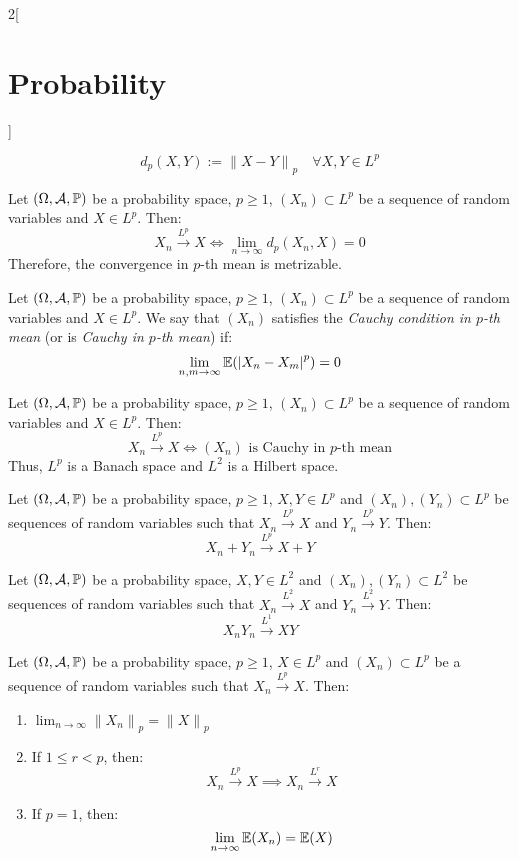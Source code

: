 \documentclass[../../../main_math.tex]{subfiles}
\begin{document}
\begin{multicols}{2}[\section{Probability}]
\begin{proposition}
    $$d_p(X,Y):={\|X-Y\|}_p\quad\forall X,Y\in L^p$$
  \end{proposition}
  \begin{proposition}
    Let $(\Omega,\mathcal{A},\mathbb{P})$ be a probability space, $p\geq 1$, $(X_n)\subset L^p$ be a sequence of random variables and $X\in L^p$. Then:
    $$X_n\overset{L^p}{\longrightarrow} X\iff\lim_{n\to\infty}d_p(X_n,X)=0$$
    Therefore, the convergence in $p$-th mean is metrizable.
  \end{proposition}
  \begin{definition}
    Let $(\Omega,\mathcal{A},\mathbb{P})$ be a probability space, $p\geq 1$, $(X_n)\subset L^p$ be a sequence of random variables and $X\in L^p$. We say that $(X_n)$ satisfies the \emph{Cauchy condition in $p$-th mean} (or is \emph{Cauchy in $p$-th mean}) if: $$\lim_{n,m\to\infty}\mathbb{E}({|X_n-X_m|}^p)=0$$
  \end{definition}
  \begin{proposition}
    Let $(\Omega,\mathcal{A},\mathbb{P})$ be a probability space, $p\geq 1$, $(X_n)\subset L^p$ be a sequence of random variables and $X\in L^p$. Then:
    $$X_n\overset{L^p}{\longrightarrow} X\iff(X_n)\text{ is Cauchy in $p$-th mean}$$
    Thus, $L^p$ is a Banach space and $L^2$ is a Hilbert space.
  \end{proposition}
  \begin{proposition}
    Let $(\Omega,\mathcal{A},\mathbb{P})$ be a probability space, $p\geq 1$, $X,Y\in L^p$ and $(X_n),(Y_n)\subset L^p$ be sequences of random variables such that $X_n\overset{L^p}{\longrightarrow} X$ and $Y_n\overset{L^p}{\longrightarrow} Y$. Then: $$X_n+Y_n\overset{L^p}{\longrightarrow} X+Y$$
  \end{proposition}
  \begin{proposition}
    Let $(\Omega,\mathcal{A},\mathbb{P})$ be a probability space, $X,Y\in L^2$ and $(X_n),(Y_n)\subset L^2$ be sequences of random variables such that $X_n\overset{L^2}{\longrightarrow} X$ and $Y_n\overset{L^2}{\longrightarrow} Y$. Then: $$X_nY_n\overset{L^1}{\longrightarrow} XY$$
  \end{proposition}
  \begin{proposition}
    Let $(\Omega,\mathcal{A},\mathbb{P})$ be a probability space, $p\geq 1$, $X\in L^p$ and $(X_n)\subset L^p$ be a sequence of random variables such that $X_n\overset{L^p}{\longrightarrow} X$. Then:
    \begin{enumerate}
      \item $\displaystyle\lim_{n\to\infty}{\|X_n\|}_p={\|X\|}_p$
      \item If $1\leq r< p$, then: $$X_n\overset{L^p}{\longrightarrow} X\implies X_n\overset{L^r}{\longrightarrow} X$$
      \item If $p=1$, then: $$\lim_{n\to\infty}\mathbb{E}(X_n)=\mathbb{E}(X)$$
    \end{enumerate}
  \end{proposition}

\end{multicols}
\end{document}
